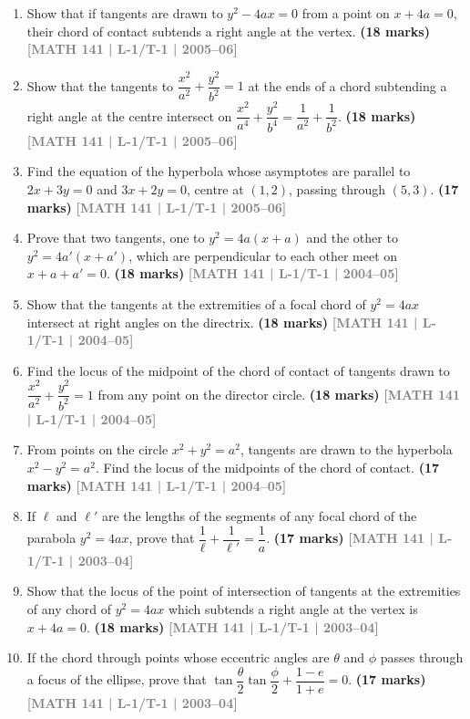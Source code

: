 \documentclass[12pt,a4paper]{article}
\newcommand{\yr}[1]{\hfill\textcolor{gray}{\small\textbf{[#1]}}}
\newcommand{\mk}[1]{\textcolor{orange!70!black}{\small\textbf{(#1 marks)}}}
\begin{document}
\begin{enumerate}
\item Show that if tangents are drawn to $y^{2}-4ax=0$ from a point on $x+4a=0$, their chord of contact subtends a right angle at the vertex.
\mk{18} \yr{MATH 141 | L-1/T-1 | 2005--06}

\item Show that the tangents to $\dfrac{x^{2}}{a^{2}}+\dfrac{y^{2}}{b^{2}}=1$ at the ends of a chord subtending a right angle at the centre intersect on $\dfrac{x^{2}}{a^{4}}+\dfrac{y^{2}}{b^{4}}=\dfrac{1}{a^{2}}+\dfrac{1}{b^{2}}$.
\mk{18} \yr{MATH 141 | L-1/T-1 | 2005--06}

\item Find the equation of the hyperbola whose asymptotes are parallel to $2x+3y=0$ and $3x+2y=0$, centre at $(1,2)$, passing through $(5,3)$.
\mk{17} \yr{MATH 141 | L-1/T-1 | 2005--06}

\item Prove that two tangents, one to $y^{2}=4a(x+a)$ and the other to $y^{2}=4a'(x+a')$, which are perpendicular to each other meet on $x+a+a'=0$.
\mk{18} \yr{MATH 141 | L-1/T-1 | 2004--05}

\item Show that the tangents at the extremities of a focal chord of $y^{2}=4ax$ intersect at right angles on the directrix.
\mk{18} \yr{MATH 141 | L-1/T-1 | 2004--05}

\item Find the locus of the midpoint of the chord of contact of tangents drawn to $\dfrac{x^{2}}{a^{2}}+\dfrac{y^{2}}{b^{2}}=1$ from any point on the director circle.
\mk{18} \yr{MATH 141 | L-1/T-1 | 2004--05}

\item From points on the circle $x^{2}+y^{2}=a^{2}$, tangents are drawn to the hyperbola $x^{2}-y^{2}=a^{2}$. Find the locus of the midpoints of the chord of contact.
\mk{17} \yr{MATH 141 | L-1/T-1 | 2004--05}

\item If $\ell$ and $\ell'$ are the lengths of the segments of any focal chord of the parabola $y^{2}=4ax$, prove that $\dfrac{1}{\ell}+\dfrac{1}{\ell'}=\dfrac{1}{a}$.
\mk{17} \yr{MATH 141 | L-1/T-1 | 2003--04}

\item Show that the locus of the point of intersection of tangents at the extremities of any chord of $y^{2}=4ax$ which subtends a right angle at the vertex is $x+4a=0$.
\mk{18} \yr{MATH 141 | L-1/T-1 | 2003--04}

\item If the chord through points whose eccentric angles are $\theta$ and $\phi$ passes through a focus of the ellipse, prove that $\tan\dfrac{\theta}{2}\tan\dfrac{\phi}{2}+\dfrac{1-e}{1+e}=0$.
\mk{17} \yr{MATH 141 | L-1/T-1 | 2003--04}

\end{enumerate}
\end{document}
